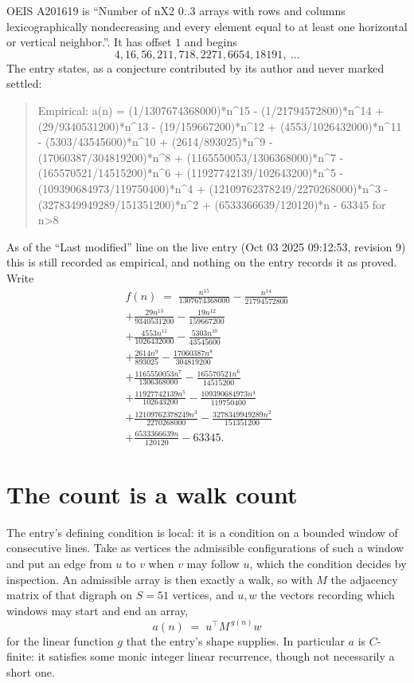 \documentclass[11pt,a4paper]{article}
\theoremstyle{plain}
\theoremstyle{definition}
\begin{document}
OEIS A201619 is ``Number of nX2 0..3 arrays with rows and columns lexicographically nondecreasing and every element equal to at least one horizontal or vertical neighbor.''. It has offset $1$ and begins
\[
4, 16, 56, 211, 718, 2271, 6654, 18191,\ \dots
\]
The entry states, as a conjecture contributed by its author and never marked settled:
\begin{quote}\raggedright\small
Empirical: a(n) = (1/1307674368000)*n\^{}15 - (1/21794572800)*n\^{}14 + (29/9340531200)*n\^{}13 - (19/159667200)*n\^{}12 + (4553/1026432000)*n\^{}11 - (5303/43545600)*n\^{}10 + (2614/893025)*n\^{}9 - (17060387/304819200)*n\^{}8 + (1165550053/1306368000)*n\^{}7 - (165570521/14515200)*n\^{}6 + (11927742139/102643200)*n\^{}5 - (109390684973/119750400)*n\^{}4 + (12109762378249/2270268000)*n\^{}3 - (3278349949289/151351200)*n\^{}2 + (6533366639/120120)*n - 63345 for n>8
\end{quote}
As of the ``Last modified'' line on the live entry (Oct 03 2025 09:12:53, revision 9) this is still
recorded as empirical, and nothing on the entry records it as proved. Write
\begin{multline*}
f(n)\;=\;\frac{n^{15}}{1307674368000} - \frac{n^{14}}{21794572800} \\
+ \frac{29 n^{13}}{9340531200} - \frac{19 n^{12}}{159667200} \\
+ \frac{4553 n^{11}}{1026432000} - \frac{5303 n^{10}}{43545600} \\
+ \frac{2614 n^{9}}{893025} - \frac{17060387 n^{8}}{304819200} \\
+ \frac{1165550053 n^{7}}{1306368000} - \frac{165570521 n^{6}}{14515200} \\
+ \frac{11927742139 n^{5}}{102643200} - \frac{109390684973 n^{4}}{119750400} \\
+ \frac{12109762378249 n^{3}}{2270268000} - \frac{3278349949289 n^{2}}{151351200} \\
+ \frac{6533366639 n}{120120} - 63345.
\end{multline*}

\section{The count is a walk count}

The entry's defining condition is local: it is a condition on a bounded window of consecutive lines. Take as vertices the
admissible configurations of such a window and put an edge from $u$ to $v$ when $v$ may
follow $u$, which the condition decides by inspection. An admissible array is then exactly a
walk, so with $M$ the adjacency matrix of that digraph on $S=51$ vertices, and $u,w$ the
vectors recording which windows may start and end an array,
\[
a(n)\;=\;u^{\!\top}M^{\,g(n)}w
\]
for the linear function $g$ that the entry's shape supplies. In particular $a$ is
$C$-finite: it satisfies some monic integer linear recurrence, though not necessarily a short
one.
\end{document}
